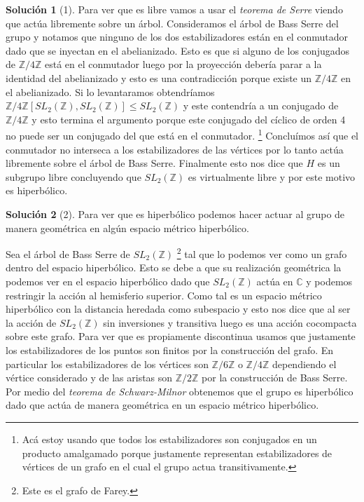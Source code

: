 \documentclass[12pt]{article}
\theoremstyle{plain}
\theoremstyle{definition}
\newtheorem*{sol}{Solución}
\theoremstyle{remark}
\newcommand\ZZ{\mathbb{Z}}
\newcommand\CC{\mathbb{C}}
\begin{document}
\begin{sol}[1]
  Para ver que es libre vamos a usar el \emph{teorema de Serre} viendo que actúa libremente sobre un árbol. Consideramos el árbol de Bass Serre del grupo y notamos que ninguno de los dos estabilizadores están en el conmutador dado que se inyectan en el abelianizado. Esto es que si alguno de los conjugados de $\ZZ / 4\ZZ$ está en el conmutador luego por la proyección debería parar a la identidad del abelianizado y esto es una contradicción porque existe un $\ZZ / 4\ZZ$ en el abelianizado. Si lo levantaramos obtendríamos $\ZZ / 4\ZZ [SL_2(\ZZ),SL_2(\ZZ)] \le SL_2(\ZZ)$ y este contendría a un conjugado de $\ZZ / 4\ZZ$ y esto termina el argumento porque este conjugado del cíclico de orden 4 no puede ser un conjugado del que está en el conmutador.
  \footnote{Acá estoy usando que todos los estabilizadores son conjugados en un producto amalgamado porque justamente representan estabilizadores de vértices de un grafo en el cual el grupo actua transitivamente.}
  Concluímos así que el conmutador no interseca a los estabilizadores de las vértices por lo tanto actúa libremente sobre el árbol de Bass Serre. Finalmente esto nos dice que $H$ es un subgrupo libre concluyendo que $SL_2(\ZZ)$ es virtualmente libre y por este motivo es hiperbólico. 
 
\end{sol}	
	
	
\begin{sol}[2]
	Para ver que es hiperbólico podemos hacer actuar al grupo de manera geométrica en algún espacio métrico hiperbólico. 
	
	Sea el árbol de Bass Serre de $SL_2(\ZZ)$  \footnote{Este es el grafo de Farey.} tal que lo podemos ver como un grafo dentro del espacio hiperbólico. Esto se debe a que su realización geométrica la podemos ver en el espacio hiperbólico dado que $SL_2(\ZZ)$ actúa en $\CC$ y podemos restringir la acción al hemisferio superior. Como tal es un espacio métrico hiperbólico con la distancia heredada como subespacio y esto nos dice que al ser la acción de $SL_2(\ZZ)$ sin inversiones y transitiva luego es una acción cocompacta sobre este grafo. Para ver que es propiamente discontinua usamos que justamente los estabilizadores de los puntos son finitos por la construcción del grafo. En particular los estabilizadores de los vértices son $\ZZ / 6\ZZ$ o $\ZZ / 4\ZZ$ dependiendo el vértice considerado y de las aristas son $\ZZ/ 2\ZZ$ por la construcción de Bass Serre. Por medio del \emph{teorema de Schwarz-Milnor} obtenemos que el grupo es hiperbólico dado que actúa de manera geométrica en un espacio métrico hiperbólico.
\end{sol}
	
	
	
	
	
	
	
	
	
	
	
	
	
	
\end{document}
